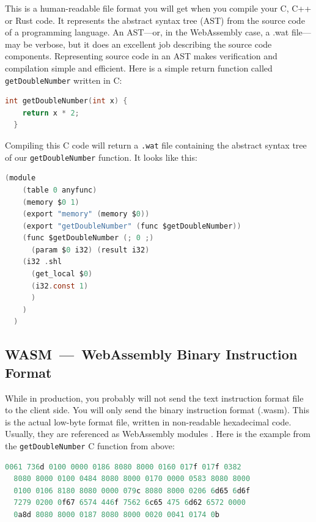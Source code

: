 \documentclass[10pt]{article}
\begin{document}
\begin{sloppypar}
  This is a human-readable file format you will get when you compile your C, C++ or Rust code. It represents the abstract syntax tree (AST) from the source code of a programming language. An AST—or, in the WebAssembly case, a .wat file—may be verbose, but it does an excellent job describing the source code components. Representing source code in an AST makes verification and compilation simple and efficient. Here is a simple return function called \lstinline{getDoubleNumber} written in C:

  \vspace{7pt}
  \begin{lstlisting}[language=C, caption=Code example in C., label=lst:c-example]
  int getDoubleNumber(int x) {
    return x * 2;
  }\end{lstlisting}

  Compiling this C code will return a \lstinline{.wat} file containing the abstract syntax tree of our \lstinline{getDoubleNumber} function. It looks like this:

  \vspace{7pt}
  \begin{lstlisting}[language=C, caption=Code example from above compiled into the WebAssembly Text Format., label=lst:wat-example]
  (module
    (table 0 anyfunc)
    (memory $0 1)
    (export "memory" (memory $0))
    (export "getDoubleNumber" (func $getDoubleNumber))
    (func $getDoubleNumber (; 0 ;)
      (param $0 i32) (result i32)
    (i32 .shl
      (get_local $0)
      (i32.const 1)
      )
    )
  )\end{lstlisting}

  \subsection{WASM~—~WebAssembly Binary Instruction Format}
  \label{sec:webassembly-binary-instruction-format}

  While in production, you probably will not send the text instruction format file to the client side. You will only send the binary instruction format (.wasm). This is the actual low-byte format file, written in non-readable hexadecimal code. Usually, they are referenced as WebAssembly modules \citep{mozilla_webassembly_2023}. Here is the example from the \lstinline{getDoubleNumber} C function from above:

  \vspace{7pt}
  \begin{lstlisting}[language=C, caption=Code example from above compiled into the WebAssembly \\ Binary Instruction Format., label=lst:binary-example]
  0061 736d 0100 0000 0186 8080 8000 0160 017f 017f 0382
  8080 8000 0100 0484 8080 8000 0170 0000 0583 8080 8000
  0100 0106 8180 8080 0000 079c 8080 8000 0206 6d65 6d6f
  7279 0200 0f67 6574 446f 7562 6c65 475 6d62 6572 0000
  0a8d 8080 8000 0187 8080 8000 0020 0041 0174 0b\end{lstlisting}


\end{sloppypar}
\end{document}

